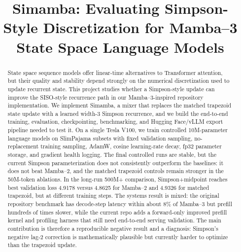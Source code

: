 \documentclass[conference]{IEEEtran}
\newcommand{\modelname}{Simamba\xspace}
\newcommand{\mambatwo}{Mamba--2\xspace}
\newcommand{\mambathree}{Mamba--3\xspace}
\begin{document}
\title{\modelname: Evaluating Simpson-Style Discretization for Mamba--3 State Space Language Models}

\author{
}

\maketitle

\begin{abstract}
State space sequence models offer linear-time alternatives to Transformer attention, but their quality and stability depend strongly on the numerical discretization used to update recurrent state. This project studies whether a Simpson-style update can improve the SISO-style recurrence path in our \mambathree-inspired repository implementation. We implement \modelname, a mixer that replaces the matched trapezoid state update with a learned width-3 Simpson recurrence, and we build the end-to-end training, evaluation, checkpointing, benchmarking, and Hugging Face/vLLM export pipeline needed to test it. On a single Tesla V100, we train controlled 10M-parameter language models on SlimPajama subsets with fixed validation sampling, no-replacement training sampling, AdamW, cosine learning-rate decay, fp32 parameter storage, and gradient health logging. The final controlled runs are stable, but the current Simpson parameterization does not consistently outperform the baselines: it does not beat \mambatwo, and the matched trapezoid controls remain stronger in the 50M-token ablations. In the long-run 500M+ comparison, Simpson+midpoint reaches best validation loss 4.9178 versus 4.8625 for \mambatwo and 4.9326 for matched trapezoid, but at different training steps. The systems result is mixed: the original repository benchmark has decode-step latency within about 8\% of \mambathree but prefill hundreds of times slower, while the current repo adds a forward-only improved prefill kernel and profiling harness that still need end-to-end serving validation. The main contribution is therefore a reproducible negative result and a diagnosis: Simpson's negative lag-2 correction is mathematically plausible but currently harder to optimize than the trapezoid update.
\end{abstract}
\end{document}
